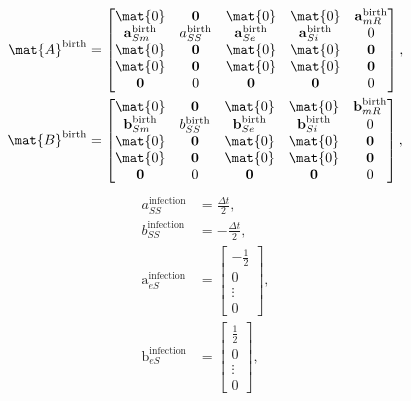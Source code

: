 \documentclass{jpmarticle}
\renewcommand{\vec}[1]{\boldsymbol{\mathrm{#1}}}
\begin{document}
\begin{equation}
  \begin{split}
    \mat{A}^{\text{birth}} &=
    \begin{bmatrix}
      \mat{0} & \vec{0} & \mat{0} & \mat{0} & \vec{a}_{mR}^{\text{birth}}
      \\
      \vec{a}_{Sm}^{\text{birth}} & a_{SS}^{\text{birth}} &
      \vec{a}_{Se}^{\text{birth}} & \vec{a}_{Si}^{\text{birth}} & 0
      \\
      \mat{0} & \vec{0} & \mat{0} & \mat{0} & \vec{0}
      \\
      \mat{0} & \vec{0} & \mat{0} & \mat{0} & \vec{0}
      \\
      \vec{0} & 0 & \vec{0} & \vec{0} & 0
    \end{bmatrix},
    \\
    \mat{B}^{\text{birth}} &=
    \begin{bmatrix}
      \mat{0} & \vec{0} & \mat{0} & \mat{0} & \vec{b}_{mR}^{\text{birth}}
      \\
      \vec{b}_{Sm}^{\text{birth}} & b_{SS}^{\text{birth}} &
      \vec{b}_{Se}^{\text{birth}} & \vec{b}_{Si}^{\text{birth}} & 0
      \\
      \mat{0} & \vec{0} & \mat{0} & \mat{0} & \vec{0}
      \\
      \mat{0} & \vec{0} & \mat{0} & \mat{0} & \vec{0}
      \\
      \vec{0} & 0 & \vec{0} & \vec{0} & 0
    \end{bmatrix},
  \end{split}
\end{equation}
\begin{equation}
  \begin{split}
    a_{SS}^{\text{infection}} &=
    \frac{\Delta t}{2},
    \\
    b_{SS}^{\text{infection}} &=
    - \frac{\Delta t}{2},
    \\
    \vec{a}_{eS}^{\text{infection}} &=
    \begin{bmatrix}
      - \frac{1}{2} \\ 0 \\ \vdots \\ 0
    \end{bmatrix},
    \\
    \vec{b}_{eS}^{\text{infection}} &=
    \begin{bmatrix}
      \frac{1}{2} \\ 0 \\ \vdots \\ 0
    \end{bmatrix},
  \end{split}
\end{equation}
\end{document}
